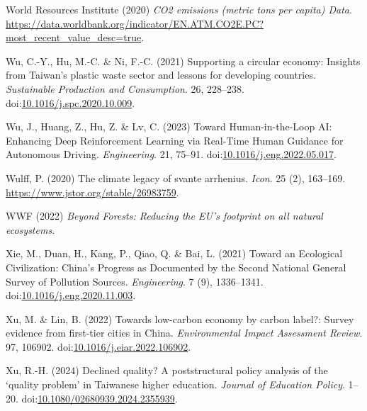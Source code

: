 \documentclass[
  letterpaper,
  DIV=11,
  numbers=noendperiod]{scrartcl}
\newlength{\cslhangindent}
\newenvironment{CSLReferences}[2] %
 {\begin{list}{}{%
  \setlength{\itemindent}{0pt}
  \setlength{\leftmargin}{0pt}
  \setlength{\parsep}{0pt}
  \ifodd #1
   \setlength{\leftmargin}{\cslhangindent}
   \setlength{\itemindent}{-1\cslhangindent}
  \fi
  \setlength{\itemsep}{#2\baselineskip}}}
 {\end{list}}
\begin{document}
\begin{CSLReferences}{0}{1}
World Resources Institute (2020) \emph{{CO2} emissions (metric tons per
capita) {\textbar} {Data}}.
\url{https://data.worldbank.org/indicator/EN.ATM.CO2E.PC?most_recent_value_desc=true}.

Wu, C.-Y., Hu, M.-C. \& Ni, F.-C. (2021) Supporting a circular economy:
{Insights} from {Taiwan}'s plastic waste sector and lessons for
developing countries. \emph{Sustainable Production and Consumption}. 26,
228--238.
doi:\href{https://doi.org/10.1016/j.spc.2020.10.009}{10.1016/j.spc.2020.10.009}.

Wu, J., Huang, Z., Hu, Z. \& Lv, C. (2023) Toward {Human-in-the-Loop
AI}: {Enhancing Deep Reinforcement Learning} via {Real-Time Human
Guidance} for {Autonomous Driving}. \emph{Engineering}. 21, 75--91.
doi:\href{https://doi.org/10.1016/j.eng.2022.05.017}{10.1016/j.eng.2022.05.017}.

Wulff, P. (2020) The climate legacy of svante arrhenius. \emph{Icon}. 25
(2), 163--169. \url{https://www.jstor.org/stable/26983759}.

WWF (2022) \emph{Beyond {Forests}: {Reducing} the {EU}'s footprint on
all natural ecosystems}.

Xie, M., Duan, H., Kang, P., Qiao, Q. \& Bai, L. (2021) Toward an
{Ecological Civilization}: {China}'s {Progress} as {Documented} by the
{Second National General Survey} of {Pollution Sources}.
\emph{Engineering}. 7 (9), 1336--1341.
doi:\href{https://doi.org/10.1016/j.eng.2020.11.003}{10.1016/j.eng.2020.11.003}.

Xu, M. \& Lin, B. (2022) Towards low-carbon economy by carbon label?:
{Survey} evidence from first-tier cities in {China}. \emph{Environmental
Impact Assessment Review}. 97, 106902.
doi:\href{https://doi.org/10.1016/j.eiar.2022.106902}{10.1016/j.eiar.2022.106902}.

Xu, R.-H. (2024) Declined quality? {A} poststructural policy analysis of
the {`quality problem'} in {Taiwanese} higher education. \emph{Journal
of Education Policy}. 1--20.
doi:\href{https://doi.org/10.1080/02680939.2024.2355939}{10.1080/02680939.2024.2355939}.


\end{CSLReferences}
\end{document}
